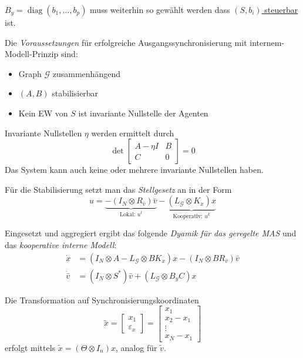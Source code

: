 \underline{$B_y = \operatorname{diag}(b_1,\dots,b_p)$} muss weiterhin so gewählt werden dass
\underline{$(S, b_i)$ steuerbar} ist.

Die \emph{Voraussetzungen} für erfolgreiche Ausgangssynchronisierung
mit internem-Modell-Prinzip sind:

\begin{itemize}
    \item Graph $\mathcal{G}$ zusammenhängend
    \item $(A,B)$ stabilisierbar
    \item Kein EW von $S$ ist invariante Nullstelle der Agenten
\end{itemize}

Invariante Nullstellen $\eta$ werden ermittelt durch
\begin{equation}
    \det \begin{bmatrix}
        A-\eta I & B \\
        C & 0
    \end{bmatrix} = 0
\end{equation}
Das System kann auch keine oder mehrere invariante Nullstellen haben.

Für die Stabilisierung setzt man das \emph{Stellgesetz} an in der Form
\begin{equation}
    u=\underbrace{-(I_N \otimes R_{\bar{v}})\bar{v}}_{\text{Lokal: }u^l} - \underbrace{(L_{\mathcal{G}} \otimes K_x)x}_{\text{Kooperativ: }u^k}
\end{equation}

Eingesetzt und aggregiert ergibt das folgende \emph{Dyamik für das geregelte MAS} und das
\emph{kooperative interne Modell}:
\begin{align}
    \dot{x} &= (I_N \otimes A - L_{\mathcal{G}} \otimes BK_x) x - (I_N \otimes BR_{\bar{v}})\bar{v} \\
    \dot{\bar{v}} &= (I_N \otimes S^*)\bar{v} + (L_{\mathcal{G}}\otimes B_y C)x
\end{align}

Die Transformation auf Synchronisierungskoordinaten
\begin{equation}
    \tilde{x}=\begin{bmatrix}
        x_1 \\
        \varepsilon_x
    \end{bmatrix}
    = \begin{bmatrix}
        x_1 \\ x_2-x_1 \\ \vdots \\ x_N-x_1
    \end{bmatrix}
\end{equation}
erfolgt mittels $\tilde{x}=(\Theta \otimes I_n)x$, analog für $\tilde{v}$.


